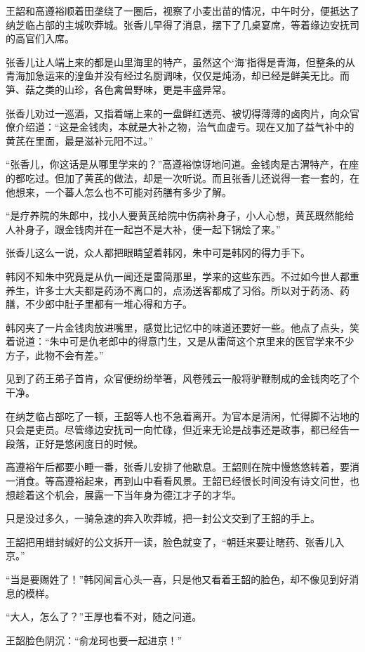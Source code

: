 王韶和高遵裕顺着田垄绕了一圈后，视察了小麦出苗的情况，中午时分，便抵达了纳芝临占部的主城吹莽城。张香儿早得了消息，摆下了几桌宴席，等着缘边安抚司的高官们入席。

张香儿让人端上来的都是山里海里的特产，虽然这个‘海’指得是青海，但整条的从青海加急运来的湟鱼并没有经过名厨调味，仅仅是炖汤，却已经是鲜美无比。而笋、菇之类的山珍，各色禽兽野味，更是丰盛异常。

张香儿劝过一巡酒，又指着端上来的一盘鲜红透亮、被切得薄薄的卤肉片，向众官僚介绍道：“这是金钱肉，本就是大补之物，治气血虚亏。现在又加了益气补中的黄芪在里面，最是滋补元阳不过。”

“张香儿，你这话是从哪里学来的？”高遵裕惊讶地问道。金钱肉是古渭特产，在座的都吃过。但加了黄芪的做法，却是一次听说。而且张香儿还说得一套一套的，在他想来，一个蕃人怎么也不可能对药膳有多少了解。

“是疗养院的朱郎中，找小人要黄芪给院中伤病补身子，小人心想，黄芪既然能给人补身子，跟金钱肉并在一起岂不是大补，便一起下锅烩了来。”

张香儿这么一说，众人都把眼睛望着韩冈，朱中可是韩冈的得力手下。

韩冈不知朱中究竟是从仇一闻还是雷简那里，学来的这些东西。不过如今世人都重养生，许多士大夫都是药汤不离口的，点汤送客都成了习俗。所以对于药汤、药膳，不少郎中肚子里都有一堆心得和方子。

韩冈夹了一片金钱肉放进嘴里，感觉比记忆中的味道还要好一些。他点了点头，笑着说道：“朱中可是仇老郎中的得意门生，又是从雷简这个京里来的医官学来不少方子，此物不会有差。”

见到了药王弟子首肯，众官便纷纷举箸，风卷残云一般将驴鞭制成的金钱肉吃了个干净。

在纳芝临占部吃了一顿，王韶等人也不急着离开。为官本是清闲，忙得脚不沾地的只会是吏员。尽管缘边安抚司一向忙碌，但近来无论是战事还是政事，都已经告一段落，正好是悠闲度日的时候。

高遵裕午后都要小睡一番，张香儿安排了他歇息。王韶则在院中慢悠悠转着，要消一消食。等高遵裕起来，再到山中看看风景。王韶已经很长时间没有诗文问世，也想趁着这个机会，展露一下当年身为德江才子的才华。

只是没过多久，一骑急速的奔入吹莽城，把一封公文交到了王韶的手上。

王韶把用蜡封缄好的公文拆开一读，脸色就变了，“朝廷来要让瞎药、张香儿入京。”

“当是要赐姓了！”韩冈闻言心头一喜，只是他又看着王韶的脸色，却不像见到好消息的模样。

“大人，怎么了？”王厚也看不对，随之问道。

王韶脸色阴沉：“俞龙珂也要一起进京！”

